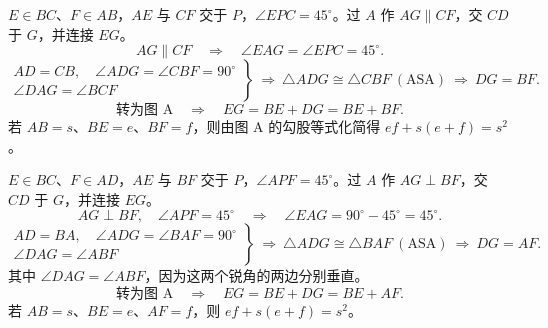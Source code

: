\par\bigskip
\noindent\begin{minipage}{\linewidth}
\(E\in BC\)、\(F\in AB\)，\(AE\) 与 \(CF\) 交于 \(P\)，\(\angle EPC=45^\circ\)。过 \(A\) 作 \(AG\parallel CF\)，交 \(CD\) 于 \(G\)，并连接 \(EG\)。
\diagram{\figIntroB\hspace{1.2cm}\figIntroBSolve}
\[
AG\parallel CF\quad\Longrightarrow\quad\angle EAG=\angle EPC=45^\circ.
\]
\[
\left.\begin{gathered}
AD=CB,\quad\angle ADG=\angle CBF=90^\circ\\
\angle DAG=\angle BCF
\end{gathered}\right\}
\ \Longrightarrow\ \triangle ADG\cong\triangle CBF\ (\mathrm{ASA})
\ \Longrightarrow\ DG=BF.
\]
\[
\text{转为图 A}\quad\Longrightarrow\quad
\boxed{EG=BE+DG=BE+BF}.
\]
若 \(AB=s\)、\(BE=e\)、\(BF=f\)，则由图 A 的勾股等式化简得 \(\boxed{ef+s(e+f)=s^2}\)。
\end{minipage}

\clearpage
\noindent\begin{minipage}{\linewidth}
\(E\in BC\)、\(F\in AD\)，\(AE\) 与 \(BF\) 交于 \(P\)，\(\angle APF=45^\circ\)。过 \(A\) 作 \(AG\perp BF\)，交 \(CD\) 于 \(G\)，并连接 \(EG\)。
\diagram{\figIntroC\hspace{1.2cm}\figIntroCSolve}
\[
AG\perp BF,\quad\angle APF=45^\circ
\quad\Longrightarrow\quad\angle EAG=90^\circ-45^\circ=45^\circ.
\]
\[
\left.\begin{gathered}
AD=BA,\quad\angle ADG=\angle BAF=90^\circ\\
\angle DAG=\angle ABF
\end{gathered}\right\}
\ \Longrightarrow\ \triangle ADG\cong\triangle BAF\ (\mathrm{ASA})
\ \Longrightarrow\ DG=AF.
\]
其中 \(\angle DAG=\angle ABF\)，因为这两个锐角的两边分别垂直。
\[
\text{转为图 A}\quad\Longrightarrow\quad
\boxed{EG=BE+DG=BE+AF}.
\]
若 \(AB=s\)、\(BE=e\)、\(AF=f\)，则 \(\boxed{ef+s(e+f)=s^2}\)。
\end{minipage}

